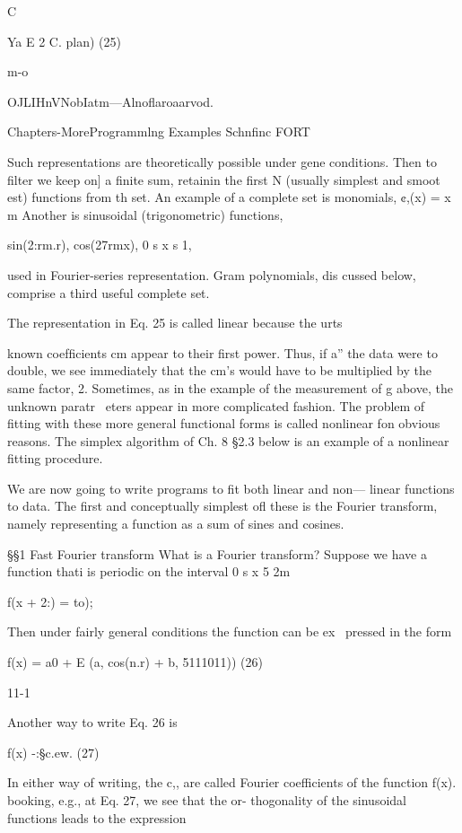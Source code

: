 C

Ya E 2 C. plan) (25)

m-o

OJLIHnVNobIatm—Alnoﬂaroaarvod.

Chapters-MoreProgrammlng Examples Schnﬁnc FORT

Such representations are theoretically possible under gene
conditions. Then to ﬁlter we keep on] a ﬁnite sum, retainin
the ﬁrst N (usually simplest and smoot est) functions from th
set. An example of a complete set is monomials, ¢,(x) = x m
Another is sinusoidal (trigonometric) functions,

sin(2:rm.r), cos(27rmx), 0 s x s 1,

used in Fourier-series representation. Gram polynomials, dis
cussed below, comprise a third useful complete set.

The representation in Eq. 25 is called linear because the urts

known coefﬁcients cm appear to their ﬁrst power. Thus, if a”
the data were to double, we see immediately that the cm's would
have to be multiplied by the same factor, 2. Sometimes, as in the
example of the measurement of g above, the unknown paratr~
eters appear in more complicated fashion. The problem of ﬁtting
with these more general functional forms is called nonlinear fon
obvious reasons. The simplex algorithm of Ch. 8 §2.3 below is an
example of a nonlinear ﬁtting procedure.

 

We are now going to write programs to ﬁt both linear and non—
linear functions to data. The ﬁrst and conceptually simplest oﬂ
these is the Fourier transform, namely representing a function as
a sum of sines and cosines.

§§1 Fast Fourier transform
What is a Fourier transform? Suppose we have a function thati
is periodic on the interval 0 s x 5 2m

f(x + 2:) = to);

Then under fairly general conditions the function can be ex~
pressed in the form

f(x) = a0 + E (a, cos(n.r) + b, 5111011)) (26)

11-1

Another way to write Eq. 26 is

f(x) -:§c.ew. (27)

In either way of writing, the c,, are called Fourier coefficients of
the function f(x). booking, e.g., at Eq. 27, we see that the or-
thogonality of the sinusoidal functions leads to the expression

